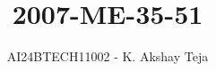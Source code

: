 \documentclass[journal,9pt,onecolumn]{IEEEtran}
\begin{document}

\vspace{3cm}
\title{2007-ME-35-51}
\author{AI24BTECH11002 - K. Akshay Teja}
\maketitle
 \bigskip
{\let\newpage\relax\maketitle}

\renewcommand{\thefigure}{\theenumi}
\renewcommand{\thetable}{\theenumi}
\setlength{\intextsep}{10pt} %

\renewcommand{\thetable}{\theenumi}
\end{document}
